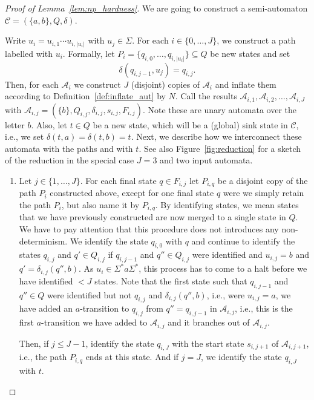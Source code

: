 \begin{toappendix}
\begin{proof}[Proof of Lemma~\ref{lem:np_hardness}]
 We are going to construct a semi-automaton $\mathcal C = (\{a,b\}, Q, \delta)$. %

 Write $u_i = u_{i,1} \cdots u_{i,|u_i|}$ with $u_j \in \Sigma$.
 For each $i \in \{0,\ldots,J\}$, we construct a path labelled with $u_i$.
 Formally, let $P_i = \{ q_{i, 0}, \ldots, q_{i,|u_i|} \} \subseteq Q$
 be new states and set
 \[
  \delta(q_{i,j-1}, u_j) = q_{i,j}.
 \]
 Then, for each $\mathcal A_i$
 we construct $J$ (disjoint) 
 copies of $\mathcal A_i$ and inflate
 them according to Definition~\ref{def:inflate_aut} by $N$.
 Call the results $\mathcal A_{i, 1}, \mathcal A_{i,2}, \ldots, \mathcal A_{i,J}$
 with $\mathcal A_{i,j} = (\{b\}, Q_{i,j}, \delta_{i,j}, s_{i,j}, F_{i,j})$.
 Note these are unary automata over the letter $b$.
 Also, let $t \in Q$ be a new state, which will be a (global) sink state in $\mathcal C$, i.e.,
 we set $\delta(t, a) = \delta(t, b) = t$.
 Next, we describe how we interconnect these automata with the paths and with $t$.
 See also Figure~\ref{fig:reduction} for a sketch of the reduction in the special case $J = 3$
 and two input automata.
 
 
 
 \begin{enumerate}
 \item Let $j \in \{1,\ldots, J\}$. For each final state $q \in F_{i,j}$
  let $P_{i,q}$ be a disjoint copy of the path $P_i$ constructed above,
  except for one final state $q$ were we simply retain the path $P_i$, but also name it by $P_{i,q}$.
  By identifying states, we mean states that we have previously constructed are now merged
  to a single state in $Q$. We have to pay attention that this procedure does not introduces
  any non-determinism.
  We identify the state $q_{i,0}$ with $q$
  and continue to identify the states $q_{i,j}$ and $q' \in Q_{i,j}$
  if $q_{i,j-1}$ and $q'' \in Q_{i,j}$ were identified
  and $u_{i,j} = b$ and $q' = \delta_{i,j}(q'', b)$. As $u_i \in \Sigma^* a \Sigma^*$, this process has to come to a halt
  before we have identified $< J$ states.
  Note that the first state such that $q_{i,j-1}$ and $q''\in Q$
  were identified but not $q_{i,j}$ and $\delta_{i,j}(q'', b)$, i.e., were $u_{i,j} = a$,
  we have added an $a$-transition to $q_{i,j}$
  from $q'' = q_{i,j-1}$ in $\mathcal A_{i,j}$, i.e., this is the first
  $a$-transition we have added to $\mathcal A_{i,j}$ and it branches out of $\mathcal A_{i,j}$.
  
  Then, if $j \le J - 1$,
  identify the state $q_{i,J}$ with the start state $s_{i,j+1}$ of $\mathcal A_{i,j+1}$, i.e.,
  the path $P_{i,q}$ ends at this state.
  And if $j = J$, we identify the state $q_{i,J}$ with $t$.
  

\end{enumerate}
\end{proof}
\end{toappendix}
